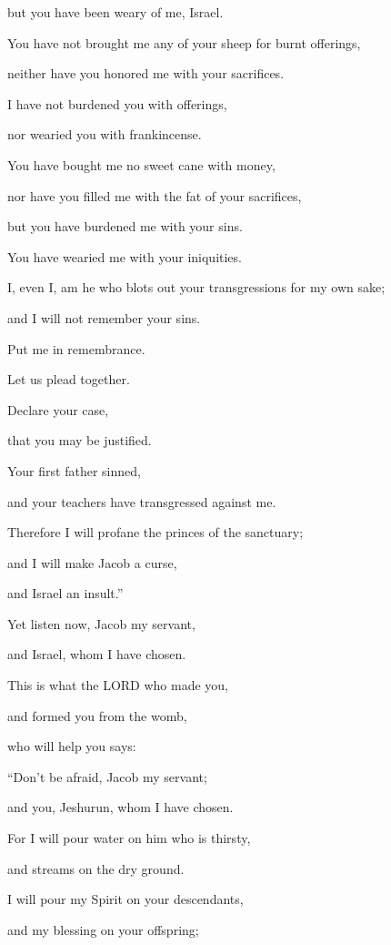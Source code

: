 but you have been weary of me, Israel.

\myverse{}You have not brought me any of your sheep for burnt offerings,

neither have you honored me with your sacrifices.

I have not burdened you with offerings,

nor wearied you with frankincense.

\myverse{}You have bought me no sweet cane with money,

nor have you filled me with the fat of your sacrifices,

but you have burdened me with your sins.

You have wearied me with your iniquities.


\vspace{\baselineskip} \myverse{}I, even I, am he who blots out your transgressions for my own
sake;

and I will not remember your sins.

\myverse{}Put me in remembrance.

Let us plead together.

Declare your case,

that you may be justified.

\myverse{}Your first father sinned,

and your teachers have transgressed against me.

\myverse{}Therefore I will profane the princes of the sanctuary;

and I will make Jacob a curse,

and Israel an insult.”


\mychapter{} \myverse*{}Yet listen now, Jacob my servant,

\quad\quad and Israel, whom I have chosen.

\myverse{}This is what the LORD who made you,

and formed you from the womb,

who will help you says:

“Don’t be afraid, Jacob my servant;

and you, Jeshurun, whom I have chosen.

\myverse{}For I will pour water on him who is thirsty,

and streams on the dry ground.

I will pour my Spirit on your descendants,

and my blessing on your offspring;

